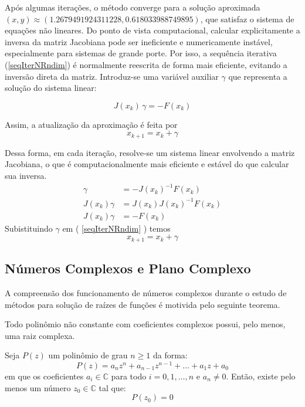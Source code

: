Após algumas iterações, o método converge para a solução aproximada \( (x, y)
\approx (1.2679491924311228, 0.618033988749895) \), que satisfaz o sistema de
equações não lineares. Do ponto de vista computacional, calcular explicitamente
a inversa da matriz Jacobiana pode ser ineficiente e numericamente instável,
especialmente para sistemas de grande porte. Por isso, a sequência iterativa
(\ref{seqIterNRndim}) é normalmente reescrita de forma mais eficiente, evitando
a inversão direta da matriz. Introduz-se uma variável auxiliar $\gamma$ que
representa a solução do sistema linear:

\begin{equation*}
    J(x_k)\,\gamma = -F(x_k)
\end{equation*}

Assim, a atualização da aproximação é feita por
\begin{equation*}
    x_{k+1} = x_k + \gamma
\end{equation*}

Dessa forma, em cada iteração, resolve-se um sistema linear envolvendo a matriz
Jacobiana, o que é computacionalmente mais eficiente e estável do que calcular
sua inversa.
\begin{align*}
    \gamma        & = - J(x_k)^{-1} F(x_k)       \\
    J(x_k) \gamma & = J(x_k) J(x_k)^{-1} F(x_k)  \\
    J(x_k) \gamma & = - F(x_k) \label{auxNRndim}
\end{align*}
Subistituindo $\gamma$ em ( \ref{seqIterNRndim} ) temos
\begin{equation*}
    x_{k+1} = x_k + \gamma
\end{equation*}

\newpage

\subsection{Números Complexos e Plano Complexo}

A compreensão dos funcionamento de números complexos durante o estudo de
métodos para solução de raízes de funções é motivida pelo seguinte teorema.
\begin{tfa}
    Todo polinômio não constante com coeficientes complexos possui, pelo menos, uma raiz complexa.

    Seja $P(z)$ um polinômio de grau $n \ge 1$ da forma:
    \[ P(z) = a_n z^n + a_{n-1} z^{n-1} + \dots + a_1 z + a_0 \]
    em que os coeficientes $a_i \in \mathbb{C}$ para todo $i = 0, 1, \dots, n$ e
    $a_n \neq 0$. Então, existe pelo menos um número $z_0 \in \mathbb{C}$ tal que:
    \[ P(z_0) = 0 \]
\end{tfa}

